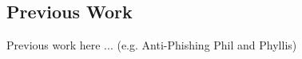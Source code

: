 \subsection{Previous Work}
\label{s:prev_work}
Previous work here ... (e.g. Anti-Phishing Phil and Phyllis)

